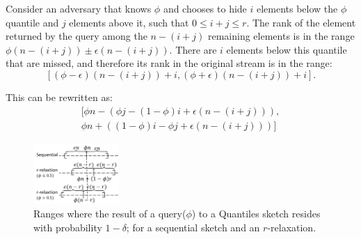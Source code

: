 Consider an adversary that knows $\phi$ and chooses to hide
$i$ elements below the $\phi$ quantile and $j$ elements above it, such that $0\leq i+j\leq r$. The rank of the element
returned by the query among the $n-(i+j)$ remaining elements is in the range 
$\phi(n-(i+j)) \pm \epsilon(n-(i+j))$.
There are $i$ elements below this quantile that are missed, and therefore its rank in the original stream is in the range:
\begin{equation}
    \left[ (\phi-\epsilon)(n-(i+j)) + i , (\phi+\epsilon)(n-(i+j)) + i \right].
    \label{eq:rank-range}
\end{equation}

This can be rewritten as:
\begin{equation}
\begin{split}
    [\phi n - (\phi j - (1-\phi)i+\epsilon(n-(i+j))), \\
    \phi n + ((1-\phi)i - \phi j +\epsilon(n-(i+j))) ] 
\end{split}
    \label{eq:rank-range-2}
\end{equation}

\iffalse

\begin{figure}
    \begin{center}
      \includegraphics[width=0.29\textwidth]{images/quantilesRelaxtionRanges.png}
    \end{center}
    \caption{Ranges where the result of a query($\phi$) to
        a Quantiles sketch resides with probability $1-\delta$;
        for a sequential sketch and an $r$-relaxation. \vspace{0.2in}}
    \label{fig:quantiles-range}
\end{figure}

